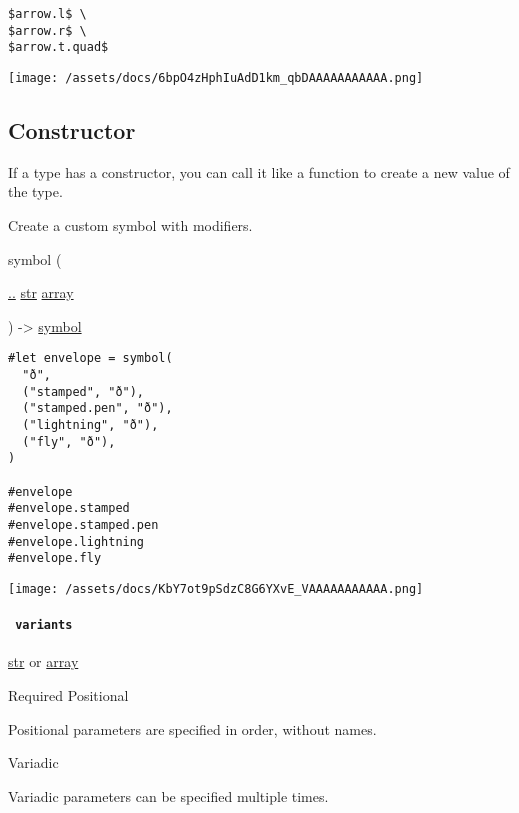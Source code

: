 \begin{verbatim}
$arrow.l$ \
$arrow.r$ \
$arrow.t.quad$
\end{verbatim}

\texttt{[image: /assets/docs/6bpO4zHphIuAdD1km\_qbDAAAAAAAAAAA.png]}

\subsection{\texorpdfstring{Constructor
{}}{Constructor }}\label{constructor}

\label{constructor-constructor-tooltip}
If a type has a constructor, you can call it like a function to create a
new value of the type.

Create a custom symbol with modifiers.

{ symbol } (

{ \hyperref[constructor-parameters-variants]{..}
\href{/docs/reference/foundations/str/}{str}
\href{/docs/reference/foundations/array/}{array} }

) -\textgreater{} \href{/docs/reference/symbols/symbol/}{symbol}

\begin{verbatim}
#let envelope = symbol(
  "ð",
  ("stamped", "ð"),
  ("stamped.pen", "ð"),
  ("lightning", "ð"),
  ("fly", "ð"),
)

#envelope
#envelope.stamped
#envelope.stamped.pen
#envelope.lightning
#envelope.fly
\end{verbatim}

\texttt{[image: /assets/docs/KbY7ot9pSdzC8G6YXvE\_VAAAAAAAAAAA.png]}

\paragraph{\texorpdfstring{\texttt{\ variants\ }}{ variants }}\label{constructor-variants}

\href{/docs/reference/foundations/str/}{str} {or}
\href{/docs/reference/foundations/array/}{array}

{Required} {{ Positional }}

\label{constructor-variants-positional-tooltip}
Positional parameters are specified in order, without names.

{{ Variadic }}

\label{constructor-variants-variadic-tooltip}
Variadic parameters can be specified multiple times.

